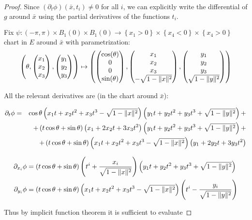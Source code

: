 \documentclass[9pt]{article}
\begin{document}
\begin{proof}
  Since $(\partial_t \phi)(\bar x, t_i) \neq 0$ for all $i$, we can explicitly write the differential of $g$ around $\bar x$ using the partial derivatives of the functions $t_i$.

  Fix $\psi: \left(-\pi, \pi \right)\times B_1(0) \times B_1(0)\rightarrow \left\{ x_1 > 0\right\}\times \left\{ x_4 <0\right\}\times \left\{ x_4 >0\right\}$ chart in $E$ around $\bar{x}$ with parametrization:
  \[
    \left(\theta, \begin{pmatrix}x_1\\ x_2 \\ x_3\end{pmatrix},\begin{pmatrix}y_1\\y_2\\y_3\end{pmatrix}\right) \mapsto \left(\begin{pmatrix}\cos(\theta)\\ 0\\ 0\\ \sin(\theta)\end{pmatrix}, \begin{pmatrix}x_1\\ x_2 \\ x_3\\-\sqrt{1-\lVert x \rVert^2}\end{pmatrix},\begin{pmatrix}y_1\\y_2\\y_3\\\sqrt{1-\lVert y \rVert^2}\end{pmatrix}\right)
  \]


  All the relevant derivatives are (in the chart around $\bar x$):

  \begin{align*}
    \partial_t\phi &=& \cos\theta\left(x_1t + x_2t^2 + x_3t^3 - \sqrt{1-\lVert x \rVert^2}\right)\left(y_1t + y_2t^2 + y_3t^3+\sqrt{1-\lVert y \rVert^2}\right)+\\
                   & &+ \left(t\cos\theta +\sin\theta\right)\left( x_1+ 2x_2t + 3x_3t^2\right)\left(y_1t + y_2t^2 + y_3t^3+\sqrt{1-\lVert y \rVert^2}\right)+\\
                   & & +\left(t\cos\theta +\sin\theta\right)\left(x_1t + x_2t^2 + x_3t^3 - \sqrt{1-\lVert x \rVert^2}\right)\left( y_1+ 2y_2t + 3y_3t^2\right)
  \end{align*}

  \begin{align*}
    \partial_{x_i} \phi &= \left(t\cos\theta +\sin\theta\right)\left( t^i + \frac{x_i}{\sqrt{1-\lVert x \rVert^2}}\right)\left(y_1t + y_2t^2 + y_3t^3+\sqrt{1-\lVert y \rVert^2}\right)\\
    \partial_{y_i} \phi &= \left(t\cos\theta +\sin\theta\right)\left(x_1t + x_2t^2 + x_3t^3 - \sqrt{1-\lVert x \rVert^2}\right)\left( t^i - \frac{y_i}{\sqrt{1-\lVert y \rVert^2}} \right)
  \end{align*}

  Thus by implicit function theorem it is sufficient to evaluate


\end{proof}
\end{document}
